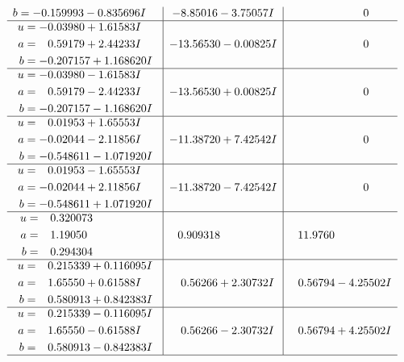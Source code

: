 \documentclass[1p]{elsarticle_modified}
\theoremstyle{definition}
\begin{document}
$$\begin{array}{c|c|c}
\begin{aligned}
b &= -0.159993 - 0.835696 I\end{aligned}
 & -8.85016 - 3.75057 I & \phantom{-0.000000 } 0 \\ \hline\begin{aligned}
u &= -0.03980 + 1.61583 I \\
a &= \phantom{-}0.59179 + 2.44233 I \\
b &= -0.207157 + 1.168620 I\end{aligned}
 & -13.56530 - 0.00825 I & \phantom{-0.000000 } 0 \\ \hline\begin{aligned}
u &= -0.03980 - 1.61583 I \\
a &= \phantom{-}0.59179 - 2.44233 I \\
b &= -0.207157 - 1.168620 I\end{aligned}
 & -13.56530 + 0.00825 I & \phantom{-0.000000 } 0 \\ \hline\begin{aligned}
u &= \phantom{-}0.01953 + 1.65553 I \\
a &= -0.02044 - 2.11856 I \\
b &= -0.548611 - 1.071920 I\end{aligned}
 & -11.38720 + 7.42542 I & \phantom{-0.000000 } 0 \\ \hline\begin{aligned}
u &= \phantom{-}0.01953 - 1.65553 I \\
a &= -0.02044 + 2.11856 I \\
b &= -0.548611 + 1.071920 I\end{aligned}
 & -11.38720 - 7.42542 I & \phantom{-0.000000 } 0 \\ \hline\begin{aligned}
u &= \phantom{-}0.320073\phantom{ +0.000000I} \\
a &= \phantom{-}1.19050\phantom{ +0.000000I} \\
b &= \phantom{-}0.294304\phantom{ +0.000000I}\end{aligned}
 & \phantom{-}0.909318\phantom{ +0.000000I} & \phantom{-}11.9760\phantom{ +0.000000I} \\ \hline\begin{aligned}
u &= \phantom{-}0.215339 + 0.116095 I \\
a &= \phantom{-}1.65550 + 0.61588 I \\
b &= \phantom{-}0.580913 + 0.842383 I\end{aligned}
 & \phantom{-}0.56266 + 2.30732 I & \phantom{-}0.56794 - 4.25502 I \\ \hline\begin{aligned}
u &= \phantom{-}0.215339 - 0.116095 I \\
a &= \phantom{-}1.65550 - 0.61588 I \\
b &= \phantom{-}0.580913 - 0.842383 I\end{aligned}
 & \phantom{-}0.56266 - 2.30732 I & \phantom{-}0.56794 + 4.25502 I\\
 \hline 
 \end{array}$$\newpage
\end{document}
